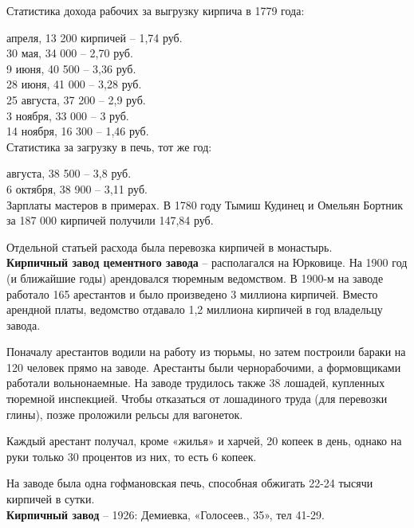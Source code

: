 Статистика дохода рабочих за выгрузку кирпича в 1779 года: 

 апреля, 13 200 кирпичей – 1,74 руб.\\
30 мая, 34 000 – 2,70 руб.\\
9 июня, 40 500 – 3,36 руб.\\
28 июня, 41 000 – 3,28 руб.\\
25 августа, 37 200 – 2,9 руб.\\
3 ноября, 33 000 – 3 руб.\\
14 ноября, 16 300 – 1,46 руб.\\

Статистика за загрузку в печь, тот же год:

 августа, 38 500 – 3,8 руб.\\
6 октября, 38 900 – 3,11 руб.\\
 
Зарплаты мастеров в примерах. В 1780 году Тымиш Кудинец и Омельян Бортник за 187 000 кирпичей получили 147,84 руб.

Отдельной статьей расхода была перевозка кирпичей в монастырь.\\

\noindent\textbf{Кирпичный завод цементного завода} – располагался на Юрковице. На 1900 год (и ближайшие годы) арендовался тюремным ведомством. В 1900-м на заводе работало 165 арестантов и было произведено 3 миллиона кирпичей. Вместо арендной платы, ведомство отдавало 1,2 миллиона кирпичей в год владельцу завода.

Поначалу арестантов водили на работу из тюрьмы, но затем построили бараки на 120 человек прямо на заводе. Арестанты были чернорабочими, а формовщиками работали вольнонаемные. На заводе трудилось также 38 лошадей, купленных тюремной инспекцией. Чтобы отказаться от лошадиного труда (для перевозки глины), позже проложили рельсы для вагонеток.

Каждый арестант получал, кроме «жилья» и харчей, 20 копеек в день, однако на руки только 30 процентов из них, то есть 6 копеек. 

На заводе была одна гофмановская печь, способная обжигать 22-24 тысячи кирпичей в сутки.\\


\noindent\textbf{Кирпичный завод} – 1926: Демиевка, «Голосеев., 35», тел 41-29.\\


